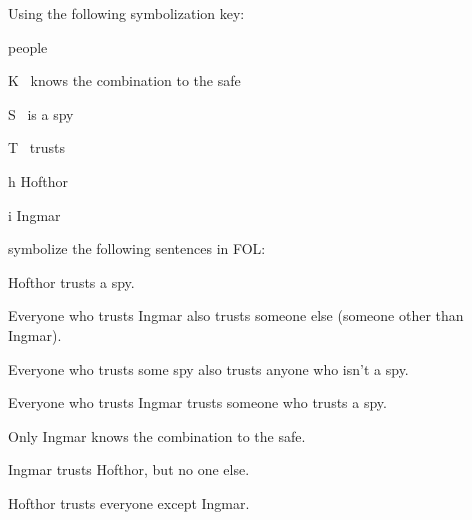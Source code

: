 
\problempart
Using the following symbolization key:
\begin{ekey}
\item[\text{domain}] people
\item[K] \blank\ knows the combination to the safe
\item[S] \blank\ is a spy
\item[T] \blank\ trusts \blank\
\item[h] Hofthor
\item[i] Ingmar
\end{ekey}
symbolize the following sentences in FOL:
\begin{earg}
\item Hofthor trusts a  spy.
\item Everyone who trusts Ingmar also trusts someone else (someone other than Ingmar).
\item Everyone who trusts some spy also trusts anyone who isn't a spy.
\item Everyone who trusts Ingmar trusts someone who trusts a spy.
\item Only Ingmar knows the combination to the safe.
\item Ingmar trusts Hofthor, but no one else.
\item Hofthor trusts everyone except Ingmar.
\end{earg}

